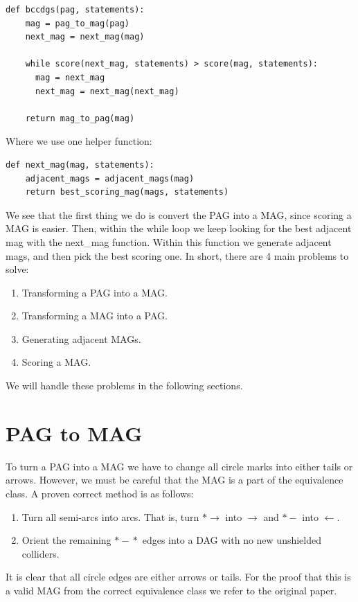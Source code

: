 \documentclass[11pt,a4paper]{report}
\theoremstyle{definition}
\begin{document}
\begin{lstlisting}
def bccdgs(pag, statements):
    mag = pag_to_mag(pag)
    next_mag = next_mag(mag)

    while score(next_mag, statements) > score(mag, statements):
      mag = next_mag
      next_mag = next_mag(next_mag)

    return mag_to_pag(mag)
\end{lstlisting}
Where we use one helper function:
\begin{lstlisting}
def next_mag(mag, statements):
    adjacent_mags = adjacent_mags(mag)
    return best_scoring_mag(mags, statements)
\end{lstlisting}
We see that the first thing we do is convert the PAG into a MAG, since
scoring a MAG is easier. Then, within the while loop we keep looking for
the best adjacent mag with the next\_mag function. Within this function we
generate adjacent mags, and then pick the best scoring one. In short,
there are 4 main problems to solve:
\begin{enumerate}
  \item Transforming a PAG into a MAG.

  \item Transforming a MAG into a PAG.

  \item Generating adjacent MAGs.

  \item Scoring a MAG.
\end{enumerate}
We will handle these problems in the following sections.

\section{PAG to MAG}
To turn a PAG into a MAG we have to change all circle marks into either
tails or arrows. However, we must be careful that the MAG is a part of the
equivalence class. A proven correct method is as follows:

\begin{enumerate}
  \item Turn all semi-arcs into arcs. That is, turn
    $*\!\!\!\rightarrow$ into $\rightarrow$ and
    $*\!-$ into $\leftarrow$.

  \item Orient the remaining $*\!\!\!-\!\!\!*$ edges into a DAG with no new unshielded
    colliders.
\end{enumerate}
It is clear that all circle edges are either arrows or tails. For the
proof that this is a valid MAG from the correct equivalence class we refer
to the original paper\cite{zhangCompletenessOrientationRules2008}.
\end{document}
